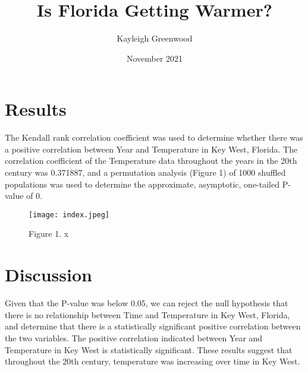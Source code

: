 \documentclass{article}
\title{Is Florida Getting Warmer?}
\author{Kayleigh Greenwood}
\date{November 2021}
\begin{document}
\maketitle

\section{Results}
The Kendall rank correlation coefficient was used to determine whether there was a positive correlation between Year and Temperature in Key West, Florida. The correlation coefficient of the Temperature data throughout the years in the 20th century was 0.371887, and a permutation analysis (Figure 1) of 1000 shuffled populations was used to determine the approximate, asymptotic, one-tailed P-value of 0.

\begin{figure}[H]
\centering
\texttt{[image: index.jpeg]}
\caption{Figure 1. x}
\end{figure}

\section{Discussion}
 Given that the P-value was below 0.05, we can reject the null hypothesis that there is no relationship between Time and Temperature in Key West, Florida, and determine that there is a statistically significant positive correlation between the two variables. The positive correlation indicated between Year and Temperature in Key West is statistically significant.
These results suggest that throughout the 20th century, temperature was increasing over time in Key West.
\end{document}
